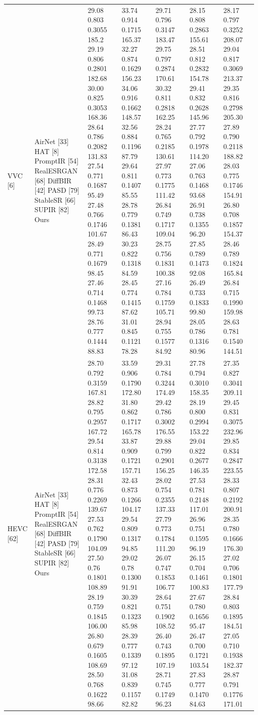 \begin{tabular}{lllllll}
VVC [6] & AirNet [33] HAT [8] PromptIR [54] RealESRGAN [68] DiffBIR [42] PASD [79] StableSR [66] SUPIR [82] Ours & 29.08 0.803 0.3055 185.2 29.19 0.806 0.2801 182.68 30.00 0.825 0.3053 168.36 28.64 0.786 0.2082 131.83 27.54 0.771 0.1687 95.49 27.48 0.766 0.1746 101.67 28.49 0.771 0.1679 98.45 27.46 0.714 0.1468 99.73 28.76 0.777 0.1444 88.83 & 33.74 0.914 0.1715 165.37 32.27 0.874 0.1629 156.23 34.06 0.916 0.1662 148.57 32.56 0.884 0.1196 87.79 29.64 0.811 0.1407 85.55 28.78 0.779 0.1381 86.43 30.23 0.822 0.1318 84.59 28.45 0.774 0.1415 87.62 31.01 0.845 0.1121 78.28 & 29.71 0.796 0.3147 183.47 29.75 0.797 0.2874 170.61 30.32 0.811 0.2818 162.25 28.24 0.765 0.2185 130.61 27.97 0.773 0.1775 111.42 26.84 0.749 0.1717 109.04 28.75 0.756 0.1831 100.38 27.16 0.784 0.1759 105.71 28.94 0.755 0.1577 84.92 & 28.15 0.808 0.2863 155.61 28.51 0.812 0.2832 154.78 29.41 0.832 0.2628 145.96 27.77 0.792 0.1978 114.20 27.06 0.763 0.1468 93.68 26.91 0.738 0.1355 96.20 27.85 0.789 0.1473 92.08 26.49 0.733 0.1833 99.80 28.05 0.786 0.1316 80.96 & 28.17 0.797 0.3252 208.07 29.04 0.817 0.3069 213.37 29.35 0.816 0.2798 205.30 27.89 0.790 0.2118 188.82 28.03 0.775 0.1746 154.91 26.80 0.708 0.1857 154.37 28.46 0.789 0.1824 165.84 26.84 0.715 0.1990 159.98 28.63 0.781 0.1540 144.51 \\
HEVC [62] & AirNet [33] HAT [8] PromptIR [54] RealESRGAN [68] DiffBIR [42] PASD [79] StableSR [66] SUPIR [82] Ours & 28.70 0.792 0.3159 167.81 28.82 0.795 0.2957 167.72 29.54 0.814 0.3138 172.58 28.31 0.776 0.2269 139.67 27.53 0.762 0.1790 104.09 27.50 0.76 0.1801 108.89 28.19 0.759 0.1845 106.00 26.80 0.679 0.1605 108.69 28.50 0.768 0.1622 98.66 & 33.59 0.906 0.1790 172.80 31.80 0.862 0.1717 165.78 33.87 0.909 0.1721 157.71 32.43 0.873 0.1266 104.17 29.54 0.809 0.1317 94.85 29.02 0.78 0.1300 91.91 30.39 0.821 0.1323 85.98 28.39 0.777 0.1339 97.12 31.08 0.839 0.1157 82.82 & 29.31 0.784 0.3244 174.49 29.42 0.786 0.3002 176.55 29.88 0.799 0.2901 156.25 28.02 0.754 0.2355 137.33 27.79 0.773 0.1784 111.20 26.07 0.747 0.1853 106.77 28.64 0.751 0.1902 108.52 26.40 0.743 0.1895 107.19 28.71 0.745 0.1749 96.23 & 27.78 0.794 0.3010 158.35 28.19 0.800 0.2994 153.22 29.04 0.822 0.2677 146.35 27.53 0.781 0.2148 117.01 26.96 0.751 0.1595 96.19 26.15 0.704 0.1461 100.83 27.67 0.780 0.1656 95.47 26.47 0.700 0.1721 103.54 27.83 0.777 0.1470 84.63 & 27.35 0.827 0.3041 209.11 29.45 0.831 0.3075 232.96 29.85 0.834 0.2847 223.55 28.33 0.807 0.2192 200.91 28.35 0.780 0.1666 176.30 27.02 0.706 0.1801 177.79 28.84 0.803 0.1895 184.51 27.05 0.710 0.1938 182.37 28.87 0.791 0.1776 171.01 \\

\end{tabular}
